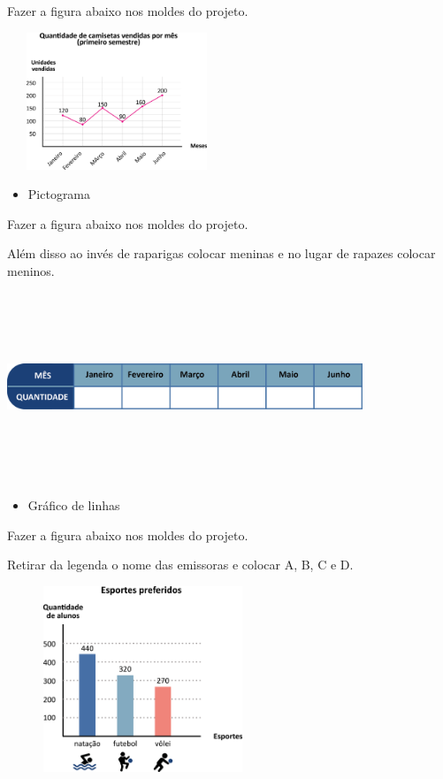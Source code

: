 \begin{escolha}
\begin{escolha}
{Fazer a figura abaixo nos moldes do projeto.

\includegraphics[width=2.58333in,height=1.61458in]{media/image88.png}

\begin{itemize}
\item
  Pictograma
\end{itemize}

Fazer a figura abaixo nos moldes do projeto.

Além disso ao invés de raparigas colocar meninas e no lugar de rapazes
colocar meninos.

\includegraphics[width=4.18370in,height=2.21686in]{media/image89.png}

\begin{itemize}
\item
  Gráfico de linhas
\end{itemize}

Fazer a figura abaixo nos moldes do projeto.

Retirar da legenda o nome das emissoras e colocar A, B, C e D.

\includegraphics[width=3.19872in,height=2.19483in]{media/image90.png}

}
\end{escolha}
\end{escolha}
